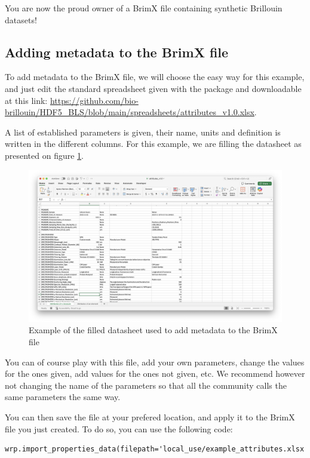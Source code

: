\documentclass{article}
\begin{document}
You are now the proud owner of a BrimX file containing synthetic Brillouin datasets!

\subsection{Adding metadata to the BrimX file}

To add metadata to the BrimX file, we will choose the easy way for this example, and just edit the standard spreadsheet given with the package and downloadable at this link: \url{https://github.com/bio-brillouin/HDF5_BLS/blob/main/spreadsheets/attributes_v1.0.xlsx}.

A list of established parameters is given, their name, units and definition is written in the different columns. For this example, we are filling the datasheet as presented on figure \ref{fig:excel_attributes}.
\begin{figure}[H]
    \centering
    \includegraphics[width=\textwidth]{img/Excel_attributes.png}
    \caption{Example of the filled datasheet used to add metadata to the BrimX file}
    \label{fig:excel_attributes}
\end{figure}

You can of course play with this file, add your own parameters, change the values for the ones given, add values for the ones not given, etc. We recommend however not changing the name of the parameters so that all the community calls the same parameters the same way.

You can then save the file at your prefered location, and apply it to the BrimX file you just created. To do so, you can use the following code:

\begin{lstlisting}
wrp.import_properties_data(filepath='local_use/example_attributes.xlsx')
\end{lstlisting}
\end{document}
